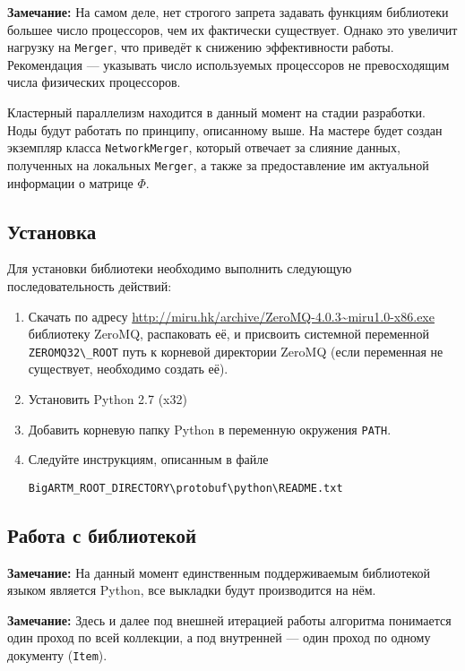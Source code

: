 {\bf Замечание:} На самом деле, нет строгого запрета задавать функциям библиотеки большее число процессоров, чем их фактически существует. Однако это увеличит нагрузку на \verb|Merger|, что приведёт к снижению эффективности работы. Рекомендация --- указывать число используемых процессоров не превосходящим числа физических процессоров.

Кластерный параллелизм находится в данный момент на стадии разработки. Ноды будут работать по принципу, описанному выше. На мастере будет создан экземпляр класса \verb|NetworkMerger|, который отвечает за слияние данных, полученных на локальных \verb|Merger|, а также за предоставление им актуальной информации о матрице $\Phi$.

\subsection{Установка}

Для установки библиотеки необходимо выполнить следующую последовательность действий:

\begin{enumerate}
	\item Скачать по адресу
	\url{http://miru.hk/archive/ZeroMQ-4.0.3~miru1.0-x86.exe}
	библиотеку ZeroMQ, распаковать её, и присвоить системной переменной \verb|ZEROMQ32\_ROOT| путь к корневой директории ZeroMQ (если переменная не существует, необходимо создать её).
	\item Установить Python 2.7 (x32)
	\item Добавить корневую папку Python в переменную окружения \verb|PATH|.
	\item Следуйте инструкциям, описанным в файле
	
	\vspace{5pt}
	\verb|BigARTM_ROOT_DIRECTORY\protobuf\python\README.txt| 
\end{enumerate}

\subsection{Работа с библиотекой}

{\bf Замечание:} На данный момент единственным поддерживаемым библиотекой языком является Python, все выкладки будут производится на нём.

{\bf Замечание:} Здесь и далее под внешней итерацией работы алгоритма понимается один проход по всей коллекции, а под внутренней --- один проход по одному документу (\verb|Item|). 

